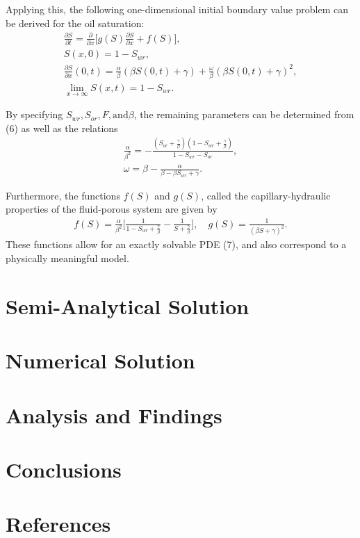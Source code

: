 \documentclass[11pt]{article}
\begin{document}
Applying this, the following one-dimensional initial boundary value problem can be derived for the oil saturation:
\begin{eqnarray}
\frac{\partial S}{\partial t} = \frac{\partial}{\partial x} \big[g(S)\frac{\partial S}{\partial x} + f(S)\big],\\
S(x,0)=1-S_{wr},\\
\frac{\partial S}{\partial x}(0,t) = \frac{\alpha}{\beta}(\beta S(0,t)+\gamma) + \frac{\omega}{\beta}(\beta S(0,t)+\gamma)^2,\\
\lim_{x\to\infty}S(x,t)=1-S_{wr}.
\end{eqnarray}

By specifying $S_{wr}, S_{or}, F, \text{and} \beta$, the remaining parameters can be determined from (6) as well as the relations
\begin{eqnarray}
\frac{\alpha}{\beta^2}=-\frac{(S_{or}+\frac{\gamma}{\beta})(1-S_{wr}+\frac{\gamma}{\beta})}{1-S_{wr}-S_{or}},\\
\omega = \beta -\frac{\alpha}{\beta-\beta S_{wr}+\gamma}.
\end{eqnarray}

Furthermore, the functions $f(S)$ and $g(S)$, called the capillary-hydraulic properties of the fluid-porous system are given by
\begin{eqnarray*}
f(S) = \frac{\alpha}{\beta^2}\bigg[\frac{1}{1-S_{wr}+\frac{\gamma}{\beta}}-\frac{1}{S+\frac{\gamma}{\beta}}\bigg],\quad g(S)=\frac{1}{(\beta S+\gamma)^2}.
\end{eqnarray*}
These functions allow for an exactly solvable PDE (7), and also correspond to a physically meaningful model.

\smallbreak
\section{Semi-Analytical Solution}

\smallbreak
\section{Numerical Solution}

\smallbreak
\section{Analysis and Findings}

\smallbreak
\section{Conclusions}

\smallbreak
\section{References}

\newpage
\end{document}
